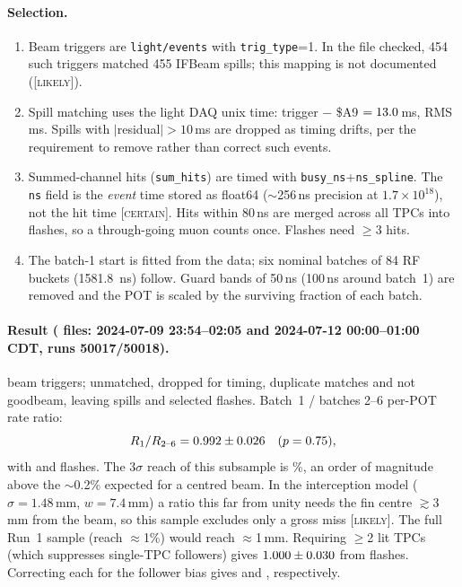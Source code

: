 \documentclass[11pt]{article}
\newcommand{\CERT}{\textsc{[certain]}}
\newcommand{\LIK}{\textsc{[likely]}}
\begin{document}
\paragraph{Selection.}
\begin{enumerate}
\item Beam triggers are \texttt{light/events} with \texttt{trig\_type}=1. In the file
checked, 454 such triggers matched 455 IFBeam spills; this mapping is not documented
(\LIK).
\item Spill matching uses the light DAQ unix time: trigger $-$ \$A9 $=13.0$\,ms, RMS
\BRresid\,ms. Spills with $|$residual$|>10$\,ms are dropped as timing drifts, per the
requirement to remove rather than correct such events.
\item Summed-channel hits (\texttt{sum\_hits}) are timed with \texttt{busy\_ns}+\texttt{ns\_spline}.
The \texttt{ns} field is the \emph{event} time stored as float64 ($\sim$256\,ns precision at
$1.7\times10^{18}$), not the hit time \CERT. Hits within 80\,ns are merged across all TPCs
into flashes, so a through-going muon counts once. Flashes need $\geq3$ hits.
\item The batch-1 start is fitted from the data; six nominal batches of 84 RF buckets
(\SI{1581.8}{ns}) follow. Guard bands of 50\,ns (100\,ns around batch~1) are removed and
the POT is scaled by the surviving fraction of each batch.
\end{enumerate}

\paragraph{Result (\BRfiles{} files: 2024-07-09 23:54--02:05 and 2024-07-12 00:00--01:00 CDT, runs 50017/50018).}
\BRtrig{} beam triggers; \BRunmatched{} unmatched, \BRdropT{} dropped for timing,
\BRdropDup{} duplicate matches and \BRdropGB{} not goodbeam, leaving \BRspills{} spills and
\BRflashes{} selected flashes. Batch~1 / batches 2--6 per-POT rate ratio:
\[ R_1/R_{2\text{--}6}=0.992\pm0.026\quad(p=0.75), \]
with \BRnone{} and \BRnrest{} flashes. The $3\sigma$ reach of this subsample is
\BRmindelta\%, an order of magnitude above the $\sim$0.2\% expected for a centred beam.
In the interception model ($\sigma=1.48$\,mm, $w=7.4$\,mm) a ratio this far from unity
needs the fin centre $\gtrsim$3\,mm from the beam, so this sample excludes only a gross
miss \LIK. The full Run~1 sample (reach $\approx$1\%) would reach $\approx$1\,mm. Requiring $\geq$2 lit TPCs
(which suppresses single-TPC followers) gives $1.000\pm0.030$ from \BRtwoN{} flashes.
Correcting each for the follower bias gives \BRcorr{} and \BRtwoCorr{}, respectively.
\end{document}
